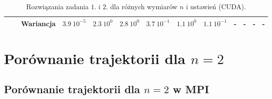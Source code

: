 \documentclass[11pt, a4paper, oneside]{article}
\begin{document}
\begin{table}[t]
\begin{adjustwidth}{-1.76cm}{}
\begin{tabular}{|c|c|c|l|l|l|l|l|l|c|c|c|c|}
                      &                            & Wariancja & $3.9 \ 10^{-5}$          & $2.3 \ 10^{0}$          & $2.8 \ 10^{0}$           & $3.7 \ 10^{-1}$         & $1.1 \ 10^{0}$           & $1.1 \ 10^{-1}$         & \textbf{-}                             & \textbf{-}                             & \textbf{-}                             & \textbf{-}                             \\ \hline
\end{tabular}
\end{adjustwidth}
\caption{Rozwiązania zadania $1$. i $2$. dla różnych wymiarów $n$ i ustawień (CUDA).}
\label{tab:CUDA}
\end{table}

\section{Porównanie trajektorii dla $n = 2$}

\subsection{Porównanie trajektorii dla $n = 2$ w MPI}
\end{document}

